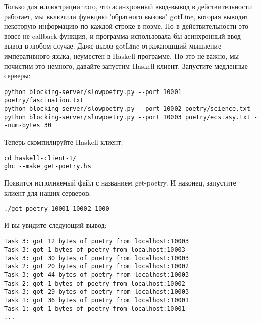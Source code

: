 Только для иллюстрации того, что асинхронный ввод-вывод в 
действительности работает, мы включили функцию "обратного вызова" 
\href{https://github.com/jdavisp3/twisted-intro/blob/master/haskell-client-1/get-poetry.hs#L60}{gotLine}, 
которая выводит некоторую информацию по каждой строке в 
поэме. Но в действительности это вовсе не callback-функция, и 
программа использовала бы асинхронный ввод-вывод в любом случае. 
Даже вызов gotLine отражающщий мышление императивного языка, 
неуместен в Haskell программе. Но это не важно, мы почистим это немного, 
давайте запустим Haskell клиент. Запустите медленные серверы: 

 \begin{verbatim}
python blocking-server/slowpoetry.py --port 10001 poetry/fascination.txt
python blocking-server/slowpoetry.py --port 10002 poetry/science.txt
python blocking-server/slowpoetry.py --port 10003 poetry/ecstasy.txt --num-bytes 30
\end{verbatim} 

Теперь скомпилируйте Haskell клиент:

 \begin{verbatim}
cd haskell-client-1/
ghc --make get-poetry.hs
\end{verbatim} 

Появится исполняемый файл с названием get-poetry. И наконец, 
запустите клиент для наших серверов: 

 \begin{verbatim}
./get-poetry 10001 10002 1000
\end{verbatim} 

И вы увидите следующий вывод:

 \begin{verbatim}
Task 3: got 12 bytes of poetry from localhost:10003
Task 3: got 1 bytes of poetry from localhost:10003
Task 3: got 30 bytes of poetry from localhost:10003
Task 2: got 20 bytes of poetry from localhost:10002
Task 3: got 44 bytes of poetry from localhost:10003
Task 2: got 1 bytes of poetry from localhost:10002
Task 3: got 29 bytes of poetry from localhost:10003
Task 1: got 36 bytes of poetry from localhost:10001
Task 1: got 1 bytes of poetry from localhost:10001
...
\end{verbatim} 


